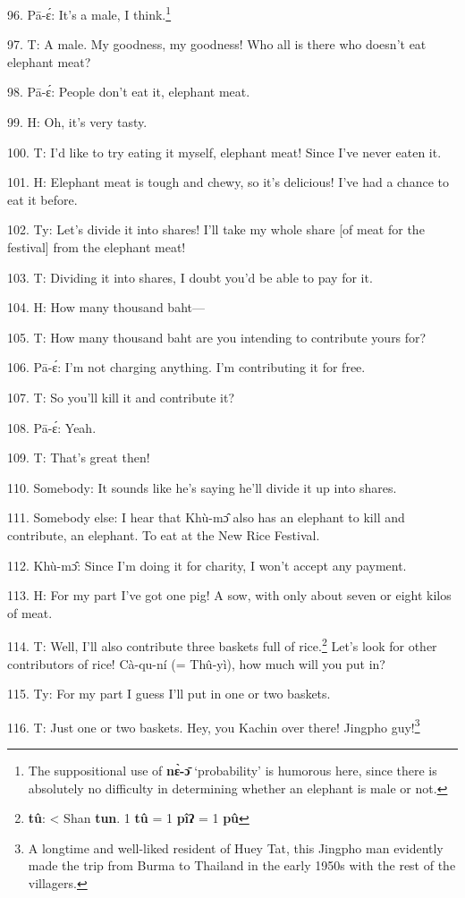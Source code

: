 96. Pā-ɛ́: It's a male, I think.\footnote{The suppositional use of \textbf{nɛ̀-ɔ̄} `probability' is humorous here, since there is absolutely no difficulty in determining whether an elephant is male or not.}

97. T: A male. My goodness, my goodness! Who all is there who doesn't eat elephant
meat?

98. Pā-ɛ́: People don't eat it, elephant meat.

99. H: Oh, it's very tasty.

100. T: I'd like to try eating it myself, elephant meat! Since I've never eaten
it.

101. H: Elephant meat is tough and chewy, so it's delicious! I've had a chance
to eat it before.

102. Ty: Let's divide it into shares! I'll take my whole share [of meat
for the festival] from the elephant meat!

103. T: Dividing it into shares, I doubt you'd be able to pay for it.

104. H: How many thousand baht---

105. T: How many thousand baht are you intending to contribute yours for?

106. Pā-ɛ́: I'm not charging anything. I'm contributing it for free.

107. T: So you'll kill it and contribute it?

108. Pā-ɛ́: Yeah.

109. T: That's great then!

110. Somebody: It sounds like he's saying he'll divide it up into shares.

111. Somebody else: I hear that Khù-mɔ̂ also has an elephant to kill and contribute,
an elephant. To eat at the New Rice Festival.

112. Khù-mɔ̂: Since I'm doing it for charity, I won't accept any payment.

113. H: For my part I've got one pig! A sow, with only about seven or eight kilos
of meat.

114. T: Well, I'll also contribute three baskets full of rice.\footnote{\textbf{tû}: < Shan \textbf{tun}. 1 \textbf{tû} = 1 \textbf{pîʔ} = 1 \textbf{pû}} Let's look
for other contributors of rice! Cà-qu-ní (= Thû-yì), how much will you put
in?

115. Ty: For my part I guess I'll put in one or two baskets.

116. T: Just one or two baskets. Hey, you Kachin over there! Jingpho guy!\footnote{A longtime and well-liked resident of Huey Tat, this Jingpho man evidently made the trip from Burma to Thailand in the early 1950s with the rest of the villagers.}

